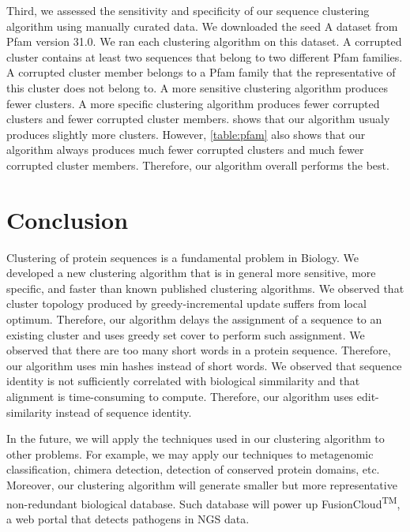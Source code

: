 \documentclass[]{article}
\begin{document}
Third, we assessed the sensitivity and specificity of our sequence clustering algorithm using manually curated data.
We downloaded the seed A dataset from Pfam version 31.0.
We ran each clustering algorithm on this dataset.
A corrupted cluster contains at least two sequences that belong to two different Pfam families.
A corrupted cluster member belongs to a Pfam family that the representative of this cluster does not belong to.
A more sensitive clustering algorithm produces fewer clusters.
A more specific clustering algorithm produces fewer corrupted clusters and fewer corrupted cluster members.
 shows that our algorithm usualy produces slightly more clusters.
However, \cref{table:pfam} also shows that our algorithm always produces much fewer corrupted clusters and much fewer corrupted cluster members.
Therefore, our algorithm overall performs the best. 

\section{Conclusion}

Clustering of protein sequences is a fundamental problem in Biology.
We developed a new clustering algorithm that is in general more sensitive, more specific, and faster than known published clustering algorithms.
We observed that cluster topology produced by greedy-incremental update suffers from local optimum.
Therefore, our algorithm delays the assignment of a sequence to an existing cluster and uses greedy set cover to perform such assignment.
We observed that there are too many short words in a protein sequence.
Therefore, our algorithm uses min hashes instead of short words.
We observed that sequence identity is not sufficiently correlated with biological simmilarity and that alignment is time-consuming to compute.
Therefore, our algorithm uses edit-similarity instead of sequence identity.

In the future, we will apply the techniques used in our clustering algorithm to other problems. For example, we may apply our techniques to metagenomic classification, chimera detection, detection of conserved protein domains, etc.
Moreover, our clustering algorithm will generate smaller but more representative non-redundant biological database. Such database will power up FusionCloud\textsuperscript{TM}, a web portal that detects pathogens in NGS data.

%


\end{document}
